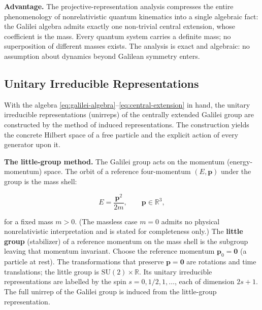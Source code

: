 \medskip\noindent\textbf{Advantage.} The projective-representation analysis compresses the entire phenomenology of nonrelativistic quantum kinematics into a single algebraic fact: the Galilei algebra admits exactly one non-trivial central extension, whose coefficient is the mass. Every quantum system carries a definite mass; no superposition of different masses exists. The analysis is exact and algebraic: no assumption about dynamics beyond Galilean symmetry enters.

\subsection{Unitary Irreducible Representations}
\label{sec:galilei-unirreps}

With the algebra \eqref{eq:galilei-algebra}--\eqref{eq:central-extension} in hand, the unitary irreducible representations (unirreps) of the centrally extended Galilei group are constructed by the method of induced representations. The construction yields the concrete Hilbert space of a free particle and the explicit action of every generator upon it.

\medskip\noindent\textbf{The little-group method.} The Galilei group acts on the momentum (energy-momentum) space. The orbit of a reference four-momentum $(E,\bm p)$ under the group is the mass shell:
\begin{linenomath}
\begin{equation}
E = \frac{\bm p^{2}}{2m}, \qquad \bm p \in \mathbb{R}^{3},
\label{eq:mass-shell}
\end{equation}
\end{linenomath}
for a fixed mass $m > 0$. (The massless case $m=0$ admits no physical nonrelativistic interpretation and is stated for completeness only.) The \textbf{little group} (stabilizer) of a reference momentum on the mass shell is the subgroup leaving that momentum invariant. Choose the reference momentum $\bm p_{0} = \bm 0$ (a particle at rest). The transformations that preserve $\bm p=\bm 0$ are rotations and time translations; the little group is $\mathrm{SU}(2) \times \mathbb{R}$. Its unitary irreducible representations are labelled by the spin $s = 0, 1/2, 1, \ldots$, each of dimension $2s+1$. The full unirrep of the Galilei group is induced from the little-group representation.

